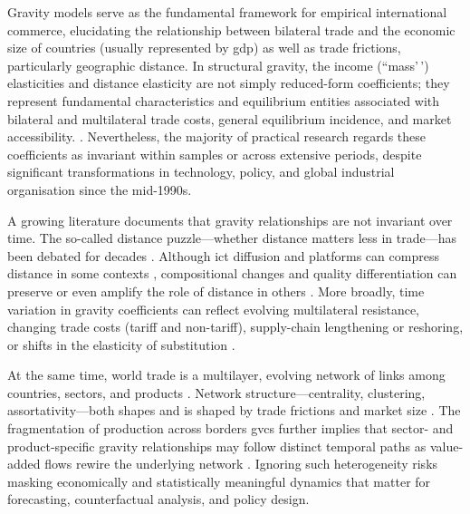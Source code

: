 \documentclass[preprint, 3p,
authoryear]{elsarticle} %
\begin{document}
Gravity models serve as the fundamental framework for empirical
international commerce, elucidating the relationship between bilateral
trade and the economic size of countries (usually represented by
\gls{gdp}) as well as trade frictions, particularly geographic distance.
In structural gravity, the income (``mass'\,') elasticities and distance
elasticity are not simply reduced-form coefficients; they represent
fundamental characteristics and equilibrium entities associated with
bilateral and multilateral trade costs, general equilibrium incidence,
and market accessibility.
\citep{anderson2003, fally2015, headmayer2014}. Nevertheless, the
majority of practical research regards these coefficients as invariant
within samples or across extensive periods, despite significant
transformations in technology, policy, and global industrial
organisation since the mid-1990s.

A growing literature documents that gravity relationships are not
invariant over time. The so-called distance puzzle---whether distance
matters less in trade---has been debated for decades
\citep{brun2005, disdier2008, berthelon2008, andersonyotov2010, novy2013, yotov2012}.
Although \gls{ict} diffusion and platforms can compress distance in some
contexts \citep{lendle2016}, compositional changes and quality
differentiation can preserve or even amplify the role of distance in
others \citep{berthelon2008, hummels2005, baldwinharrigan2011}. More
broadly, time variation in gravity coefficients can reflect evolving
multilateral resistance, changing trade costs (tariff and non-tariff),
supply-chain lengthening or reshoring, or shifts in the elasticity of
substitution
\citep{anderson2003, headmayer2014, novy2013, eaton2002, simonovska2014, egger2015}.

At the same time, world trade is a multilayer, evolving network of links
among countries, sectors, and products
\citep{fagiolo2009, debenedictis2011, barigozzi2010, garlaschelli2004, cerina2015, kivela2014}.
Network structure---centrality, clustering, assortativity---both shapes
and is shaped by trade frictions and market size
\citep{chaney2014, opsahl2010}. The fragmentation of production across
borders \glspl{gvc} further implies that sector- and product-specific
gravity relationships may follow distinct temporal paths as value-added
flows rewire the underlying network
\citep{johnson2012, koopman2014, cerina2015, antras2013}. Ignoring such
heterogeneity risks masking economically and statistically meaningful
dynamics that matter for forecasting, counterfactual analysis, and
policy design.
\end{document}
